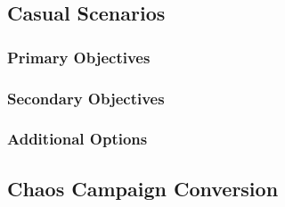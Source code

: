 

\newpage

\subsection{Casual Scenarios}



\subsubsection{Primary Objectives}



\newpage

\subsubsection{Secondary Objectives}



\subsubsection{Additional Options}



\newpage

\subsection{Chaos Campaign Conversion}



\newpage


